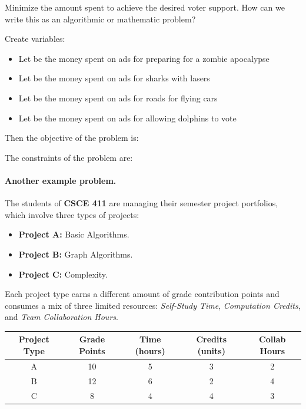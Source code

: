 \documentclass[11  pt]{article}
\begin{document}
Minimize the amount spent to achieve the desired voter support. 
How can we write this as an algorithmic or mathematic problem?		


\vs{1cm}
Create variables:
\begin{itemize}
\item
Let  be the money spent on ads for preparing for a zombie apocalypse
\item
Let  be the money spent on ads for sharks with lasers
\item
Let  be the money spent on ads for roads for flying cars
\item
Let  be the money spent on ads for allowing dolphins to vote
\end{itemize}
Then the objective of the problem is:

\vs{2cm}
The constraints of the problem are: 

\vs{4cm}
		
	
\newpage

\paragraph{Another example problem.} 
The students of \textbf{CSCE 411} are managing their semester project portfolios, which involve three types of projects:

\begin{itemize}
    \item \textbf{Project A:} Basic Algorithms.
    \item \textbf{Project B:} Graph Algorithms.
    \item \textbf{Project C:} Complexity. 
\end{itemize}

Each project type earns a different amount of grade contribution points and consumes a mix of three limited resources: \textit{Self-Study Time}, \textit{Computation Credits}, and \textit{Team Collaboration Hours}.

\begin{center}
\begin{tabular}{|c|c|c|c|c|}
\hline
\textbf{Project Type} & \textbf{Grade Points} & \textbf{Time (hours)} & \textbf{Credits (units)} & \textbf{Collab Hours} \\
\hline
A & 10 & 5 & 3 & 2 \\
B & 12 & 6 & 2 & 4 \\
C & 8 & 4 & 4 & 3 \\
\hline
\end{tabular}
\end{center}
\end{document}
